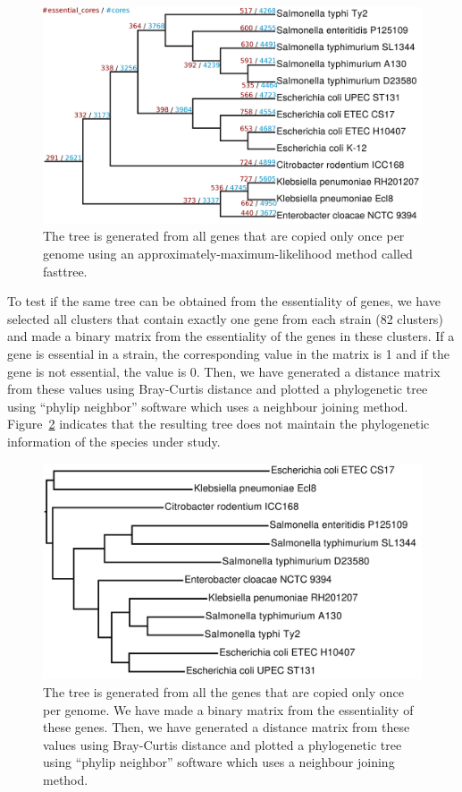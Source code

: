 \documentclass[a4paper,10pt, twocolumn]{article}
\begin{document}
\begin{figure}[H]
\includegraphics[scale=0.13]{../speciestree/speciestree-annotated.png}
\caption{The tree is generated from all genes that are copied only once per genome using an approximately-maximum-likelihood method called fasttree.}
\label{fig:species-tree}
\end{figure}

To test if the same tree can be obtained from the essentiality of genes, we have selected all clusters that contain exactly one gene from each strain (82 clusters) and made a binary matrix from the essentiality of the genes in these clusters. If a gene is essential in a strain, the corresponding value in the matrix is 1 and if the gene  is not essential, the value is 0. Then, we have generated a distance matrix from these values using Bray-Curtis distance and plotted a phylogenetic tree using ``phylip neighbor'' software which uses a neighbour joining method.  Figure~\ref{fig:essentiality-tree} indicates that the resulting tree does not maintain the phylogenetic information of the species under study.

\begin{figure}[H]
\includegraphics[scale=0.13]{make-essentiality-tree/essentiality-tree.pdf}
\caption{The tree is generated from all the genes that are copied only once per genome. We have made a binary matrix from the essentiality of these genes. Then, we have generated a distance matrix from these values using Bray-Curtis distance and plotted a phylogenetic tree using ``phylip neighbor'' software which uses a neighbour joining method.}
\label{fig:essentiality-tree}
\end{figure}
\end{document}
